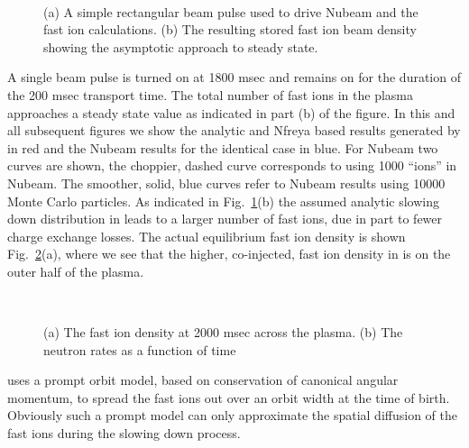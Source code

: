  \begin{figure} %
 \centering 
 \begin{narrow}{-.50in}{0in}   
   \mbox{  {}}
   \mbox{ }
\end{narrow}
 \caption{(a) A simple rectangular beam pulse used to drive Nubeam
   and the \ot fast ion calculations. (b) The resulting stored fast
   ion beam density showing the asymptotic approach to steady state.}
  \label{Fig1}
 \end{figure}
    A single beam pulse is turned on at
    1800 msec and remains on for the duration of the 200 msec transport
    time. The total number of fast ions in the plasma approaches a steady
    state value as indicated in part (b) of the figure. In this and
    all subsequent figures we show the analytic and Nfreya based
    results generated by \ot in red and the Nubeam results for the
    identical case in blue. For Nubeam two curves are shown, the
    choppier, dashed curve corresponds to using 1000 ``ions'' in
    Nubeam. The smoother, solid, blue curves refer to Nubeam results
    using 10000 Monte Carlo particles. As indicated in
    Fig.~\ref{Fig1}(b) the assumed analytic slowing down distribution
    in \ot leads to a larger number of fast ions, due in part to
    fewer charge exchange losses.  
    The actual equilibrium fast ion density is shown Fig.~\ref{Fig2}(a),
    where we see that the higher, co-injected, fast ion density in \ot is on the
    outer half of the plasma. 
 \begin{figure} %
 \centering 
 \begin{narrow}{-.50in}{0in}   
   \mbox{
     }
   \mbox{  {}}
\end{narrow}
 \caption{(a) The fast ion density at 2000 msec across the plasma. (b) The neutron rates
   as a function of time}
  \label{Fig2}
 \end{figure} 
    \ot uses a prompt orbit model, based on
    conservation of canonical angular momentum, to spread the fast
    ions out over an orbit width at the time of birth. Obviously such
    a prompt model can only approximate the spatial diffusion of the
    fast ions during the slowing down process.



